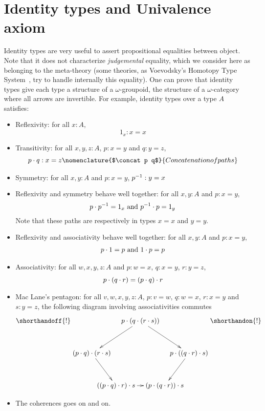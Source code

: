 \section{Identity types and Univalence axiom}
\label{sec:ua}

Identity types are very useful to assert propositional equalities
between object. Note that it does not characterize {\em judgemental}
equality, which we consider here as belonging to the meta-theory (some
theories, as Voevodsky's Homotopy Type System~\cite{hts}, try to
handle internally this equality).
One can prove that identity types give each type a structure of a
$\omega$-groupoid, \ie{} the structure of a $\omega$-category where
all arrows are invertible. For example, identity types over a type $A$
satisfies:

\begin{itemize}
\item Reflexivity: for all $x:A$, \[1_x:x=x\]
\item Transitivity: for all $x,y,z:A$, $p:x=y$ and $q:y= z$, \[\concat p
 q: x = z\nomenclature{$\concat p q$}{Concatenation of paths}\]
\item Symmetry: for all $x,y:A$ and $p:x=y$, $p^{-1}:
  y=x$
\item Reflexivity and symmetry behave well together: for all $x,y:A$
  and $p:x=y$, \[p\cdot p^{-1} = 1_x\text{ and } p^{-1}\cdot p = 1_y\]
  Note that these paths are respectively in types $x=x$ and $y=y$.
\item Reflexivity and associativity behave well together: for all
  $x,y:A$ and $p:x=y$, 
  \[p\cdot 1 = p \text{ and } 1\cdot p = p\]
\item Associativity: for all $w,x,y,z:A$ and $p:w=x$, $q:x=y$,
  $r:y=z$,
  \[p\cdot (q\cdot r) = (p\cdot q)\cdot r\]
\item Mac Lane's pentagon: for all $v,w,x,y,z:A$, $p:v=w$, $q:w=x$, $r:x=y$ and
  $s:y=z$, the following diagram involving associativities commutes
\[
  \shorthandoff{!}
  \xymatrix @!0 @R=4pc @C=3pc {
    && \concat p {(\concat q {(\concat r s)})} \ar[dll] \ar[drr]&& \\
    \concat {(\concat p q)} {(\concat r s)}\ar[dr] &&&& \concat p {(\concat
      {(\concat q r)} s)}\ar[ld] \\
    & \concat {(\concat {(\concat p q)} r)} \ar[rr] s && \concat {(\concat p
      {(\concat q r)})} s &
  }
  \shorthandon{!}
\]
\item The coherences goes on and on.
\end{itemize}

